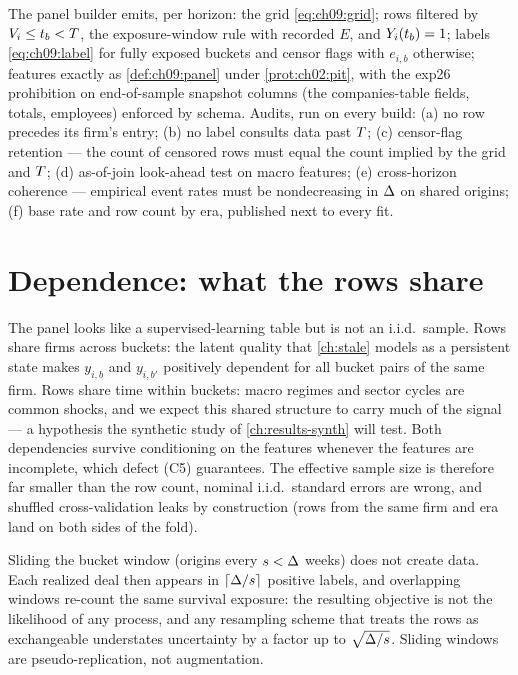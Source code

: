 \begin{protocol}\label{prot:ch09:panel}
The panel builder emits, per horizon: the grid \cref{eq:ch09:grid}; rows
filtered by $V_i \le t_b < T$, the exposure-window rule with
recorded $E$, and $Y_i(t_b)=1$; labels \cref{eq:ch09:label} for
fully exposed buckets and censor flags with $e_{i,b}$ otherwise;
features exactly as \cref{def:ch09:panel} under \cref{prot:ch02:pit},
with the exp26 prohibition on end-of-sample snapshot columns (the
companies-table  fields, totals, employees) enforced by
schema. Audits, run on every build: (a) no row precedes its firm's
entry; (b) no label consults data past $T$; (c) censor-flag
retention --- the count of censored rows must equal the count implied by
the grid and $T$; (d) as-of-join look-ahead test on macro features;
(e) cross-horizon coherence --- empirical event rates must be
nondecreasing in $\Delta$ on shared origins; (f) base rate and row
count by era, published next to every fit.
\end{protocol}

\section{Dependence: what the rows share}\label{ch09:sec:dependence}

The panel looks like a supervised-learning table but is not an i.i.d.\
sample. Rows share firms across buckets: the latent quality that
\cref{ch:stale} models as a persistent state makes $y_{i,b}$ and
$y_{i,b'}$ positively dependent for all bucket pairs of the same firm.
Rows share time within buckets: macro regimes and sector cycles are
common shocks, and we expect this shared structure to carry much of the
signal --- a hypothesis the synthetic study of \cref{ch:results-synth}
will test. Both dependencies survive conditioning on the features
whenever the features are incomplete, which defect (C5) guarantees.
The effective sample size is therefore far smaller than the row count,
nominal i.i.d.\ standard errors are wrong, and shuffled
cross-validation leaks by construction (rows from the same firm and era
land on both sides of the fold).

\begin{warning}\label{warn:ch09:sliding}
Sliding the bucket window (origins every $s < \Delta$ weeks) does not
create data. Each realized deal then appears in $\lceil \Delta/s
\rceil$ positive labels, and overlapping windows re-count the same
survival exposure: the resulting objective is not the likelihood of any
process, and any resampling scheme that treats the rows as exchangeable
understates uncertainty by a factor up to $\sqrt{\Delta/s}$. Sliding
windows are pseudo-replication, not augmentation.
\end{warning}

